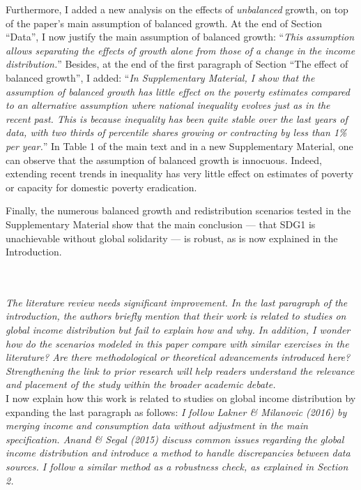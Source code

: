 \documentclass[12pt,english]{article}
\begin{document}
Furthermore, I added a new analysis on the effects of \textit{unbalanced} growth, on top of the paper's main assumption of balanced growth. At the end of Section ``Data'', I now justify the main assumption of balanced growth: ``\textit{This assumption allows separating the effects of growth alone from those of a change in the income distribution.}'' Besides, at the end of the first paragraph of Section ``The effect of balanced growth'', I added: 
``\textit{In Supplementary Material, I show that the assumption of balanced growth has little effect on the poverty estimates compared to an alternative assumption where national inequality evolves just as in the recent past. This is because inequality has been quite stable over the last years of data, with two thirds of percentile shares growing or contracting by less than 1\% per year.}'' In Table 1 of the main text and in a new Supplementary Material, one can observe that the assumption of balanced growth is innocuous. Indeed, extending recent trends in inequality has very little effect on estimates of poverty or capacity for domestic poverty eradication. 

Finally, the numerous balanced growth and redistribution scenarios tested in the Supplementary Material show that the main conclusion --- that SDG1 is unachievable without global solidarity --- is robust, as is now explained in the Introduction.

~\\ ~\\

\textit{The literature review needs significant improvement. In the last paragraph of the introduction, the authors briefly mention that their work is related to studies on global income distribution but fail to explain how and why. In addition, I wonder how do the scenarios modeled in this paper compare with similar exercises in the literature? Are there methodological or theoretical advancements introduced here? Strengthening the link to prior research will help readers understand the relevance and placement of the study within the broader academic debate. }~\\

I now explain how this work is related to studies on global income distribution by expanding the last paragraph as follows: 
\textit{I follow Lakner \& Milanovic (2016) by merging income and consumption data without adjustment in the main specification. 
Anand \& Segal (2015) discuss common issues regarding the global income distribution and introduce a method to handle discrepancies between data sources. I follow a similar method as a robustness check, as explained in Section 2.} 
\end{document}
